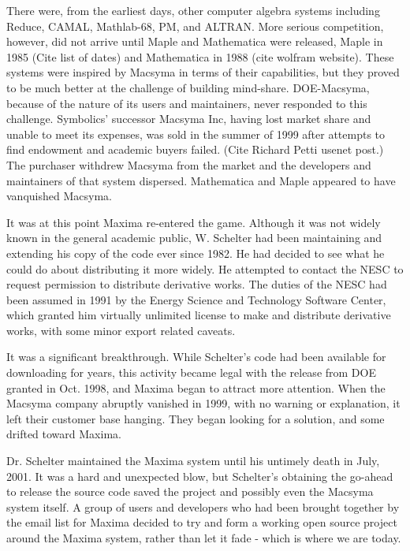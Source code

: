 There were, from the earliest days, other computer algebra systems
including Reduce, CAMAL, Mathlab-68, PM, and ALTRAN.  More 
serious competition, however, did not arrive until Maple and Mathematica were
released, Maple in 1985 (Cite list of dates) and Mathematica in 1988 (cite 
wolfram website). These systems were inspired by Macsyma in terms of their 
capabilities, but they proved to be much better at the challenge of building
mind-share.  DOE-Macsyma, because of the nature of its users and maintainers, never 
responded to this challenge. Symbolics' successor Macsyma Inc, having 
lost market share and unable to meet its expenses, was sold in the summer of 
1999 after attempts to find endowment and academic buyers failed. (Cite Richard
Petti usenet post.)  The purchaser withdrew Macsyma from the market 
and the developers and maintainers of that system dispersed. Mathematica and Maple
appeared to have vanquished Macsyma.

It was at this point Maxima re-entered the game.  Although it was not
widely known in the general academic public, W. Schelter had been
maintaining and extending his copy of the code ever since 1982. He 
had decided to see what he could do about distributing it more widely.  
He attempted to contact the NESC to request permission to distribute
derivative works.  The duties of the NESC had been assumed in 1991 by
the Energy Science and Technology Software Center, which granted him
virtually unlimited license to make and distribute derivative works,
with some minor export related caveats.  

It was a significant breakthrough.  While Schelter's code had been available 
for downloading for years, this 
activity became legal with the release from DOE granted in Oct. 1998, and
Maxima began to attract more attention.  
When the Macsyma company abruptly vanished in 1999, with no warning or
explanation, it left their customer base hanging.  They began looking
for a solution, and some drifted toward Maxima.

Dr. Schelter maintained the Maxima system until his untimely death in
July, 2001. It was a hard and unexpected blow, but Schelter's obtaining
the go-ahead to release the source code saved the project and possibly
even the Macsyma system itself. A group of users and developers who 
had been brought together by the email list for Maxima decided to try and
form a working open source project around the Maxima system, rather
than let it fade - which is where we are today.

